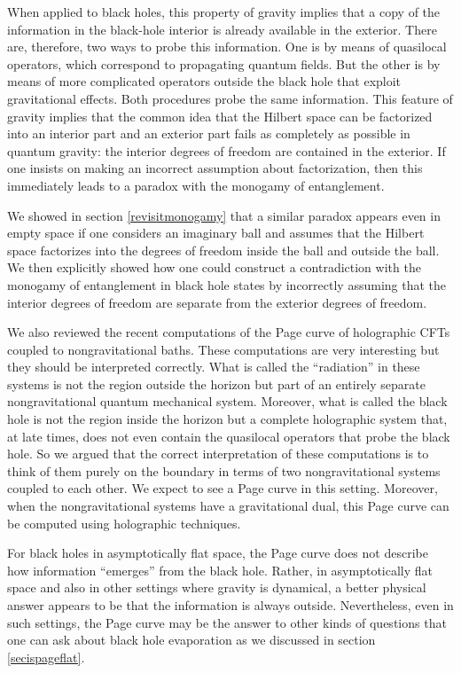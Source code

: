 \documentclass[12pt]{article}
\begin{document}
When applied to black holes, this property of gravity implies that a copy
of the information in the black-hole interior is already available in the exterior. There are, therefore, two ways to probe this information. One is by means of quasilocal operators, which correspond to propagating quantum fields.
But the other is by means of more complicated operators outside the black hole that exploit gravitational effects. Both procedures probe the same information. This feature of gravity implies that the common idea that the Hilbert space can be factorized into an interior part and an exterior part  fails as completely as possible in quantum gravity: the interior degrees of freedom are contained in the exterior.  If one insists on making an incorrect assumption about factorization,  then this immediately leads to a paradox with the monogamy of entanglement. 

We showed in section \ref{revisitmonogamy} that a similar paradox appears even in empty space if one considers an imaginary ball  and assumes that the Hilbert space factorizes into the degrees of freedom inside the ball and outside the ball. We then explicitly showed how one could construct a contradiction
with the monogamy of entanglement in black hole states by incorrectly assuming
that the interior degrees of freedom are separate from the exterior degrees of freedom. 

We also reviewed the recent computations of the Page curve of holographic
CFTs coupled to nongravitational baths. These computations are very interesting but they should be interpreted correctly.  What is called the
``radiation'' in these systems is not the region outside the horizon but
 part of an entirely separate nongravitational quantum mechanical system. Moreover, what is called the
black hole is not the region inside the horizon but a complete holographic system that, at late times, does not even contain the quasilocal operators that probe the black hole. So we argued that the correct interpretation of these
computations is to think of them purely on the boundary in terms of two nongravitational systems coupled to each other. We expect to see a Page curve in this setting. Moreover, when the nongravitational systems have 
a gravitational dual, this Page curve can be computed using holographic techniques. 

For black holes in asymptotically flat space, the Page curve does not describe how information ``emerges'' from the black hole.  Rather,  in asymptotically flat space and also in other settings where gravity is dynamical, a better
physical answer appears to be that the information is always outside. Nevertheless, even in such settings, the Page curve may be the answer to other kinds of questions that one can ask about black hole evaporation as we discussed in section \ref{secispageflat}.
\end{document}
